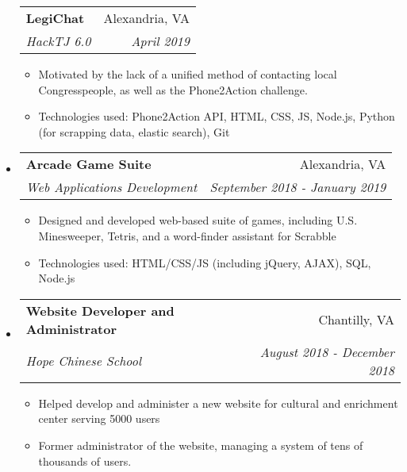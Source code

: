 \documentclass[letterpaper,11pt]{article}
\makeatletter
\newcommand{\resitem}[1]{\item #1 \vspace{-2pt}}
\newcommand{\ressubheading}[4]{
\begin{tabular*}{7.0in}{l@{\extracolsep{\fill}}r}
		\textbf{#1} & #2 \\
		\textit{#3} & \textit{#4} \\
\end{tabular*}\vspace{-6pt}}
\makeatother
\begin{document}
\begin{itemize}
    \ressubheading{LegiChat}{Alexandria, VA}{HackTJ 6.0}{April 2019}
	\begin{itemize}
		\resitem{Motivated by the lack of a unified method of contacting local Congresspeople, as well as the Phone2Action challenge.}
		\resitem{Technologies used: Phone2Action API, HTML, CSS, JS, Node.js, Python (for scrapping data, elastic search), Git}
	\end{itemize}
\item
    \ressubheading{Arcade Game Suite}{Alexandria, VA}{Web Applications Development}{September 2018 - January 2019}
	\begin{itemize}
		\resitem{Designed and developed web-based suite of games, including U.S. Minesweeper, Tetris, and a word-finder assistant for Scrabble}
		\resitem{Technologies used: HTML/CSS/JS (including jQuery, AJAX), SQL, Node.js}
	\end{itemize}
\item
    \ressubheading{Website Developer and Administrator}{Chantilly, VA}{Hope Chinese School}{August 2018 - December 2018}
	\begin{itemize}
	    \resitem{Helped develop and administer a new website for cultural and enrichment center serving 5000 users}
		\resitem{Former administrator of the website, managing a system of tens of thousands of users.}

\end{itemize}
\end{itemize}
\end{document}
